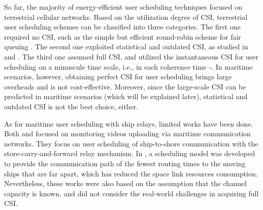 \documentclass[journal]{IEEEtran}
\begin{document}
 So far, the majority of energy-efficient user scheduling techniques focused on terrestrial cellular networks. 
 Based on the utilization degree of CSI, terrestrial user scheduling schemes can be classified into three categories. The first one required no CSI, such as the simple but efficient round-robin scheme for fair queuing \cite{p51}. The second one exploited statistical and outdated CSI, as studied in \cite{p52} and \cite{p53}. The third one assumed full CSI, and utilized the instantaneous CSI for user scheduling on a minuscule time scale, i.e., in each coherence time \cite{p4}-\cite{p7}. 
 In maritime scenarios, however, obtaining perfect CSI for user scheduling brings large overheads and is not cost-effective.
 Moreover, since the large-scale CSI can be predicted in maritime scenarios (which will be explained later), statistical and outdated CSI is not the best choice, either. 

 As for maritime user scheduling with ship relays, limited works have been done. %
 Both \cite{p300} and \cite{p301} focused on monitoring videos uploading via maritime communication networks. They focus on user scheduling of ship-to-shore communication with the store-carry-and-forward relay mechanism.  
 In \cite{p303}, a scheduling model was developed to provide the communication path of the fewest routing times to the moving ships that are far apart, which has reduced the space link resources consumption. 
 Nevertheless, these works were also based on the assumption that the channel capacity is known, and did not consider the real-world challenges in acquiring full CSI. 
  
 
 
 
 
\end{document}
